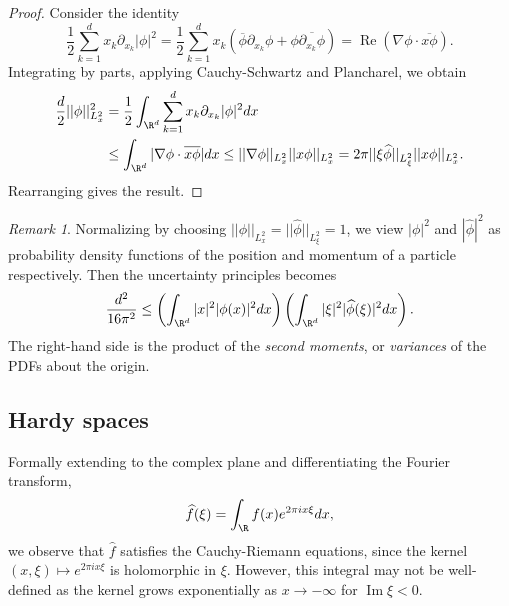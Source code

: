 \documentclass[reqno]{amsart}
\theoremstyle{definition}
\theoremstyle{remark}
\newtheorem*{remark}{Remark}
\renewcommand{\Re}{\operatorname{Re}}
\renewcommand{\Im}{\operatorname{Im}}
\begin{document}
\begin{proof}
	Consider the identity
		\[ \frac12\sum_{k = 1}^d  x_k \partial_{x_k} |\phi|^2 = \frac12 \sum_{k = 1}^d x_k (\overline \phi \partial_{x_k} \phi + \phi \overline{\partial_{x_k} \phi})= \Re (\nabla \phi \cdot \overline{x \phi}). \]
	Integrating by parts, applying Cauchy-Schwartz and Plancharel, we obtain
		\begin{align*}
			\frac{d}{2}
			||\phi||_{L^2_x}^2
				&= 
			\frac12\int_{\R^d} \sum_{k = 1}^d  x_k \partial_{x_k} |\phi|^2 dx
			\\
			&\leq \int_{\R^d} |\nabla \phi \cdot \overline{x \phi}| dx \leq ||\nabla \phi||_{L^2_x} ||x \phi||_{L^2_x} = 2\pi ||\xi \widehat \phi||_{L^2_\xi} ||x \phi||_{L^2_x}.
		\end{align*}	
	Rearranging gives the result. 	
\end{proof}

\begin{remark}
	Normalizing by choosing $||\phi||_{L^2_x} = ||\widehat \phi||_{L^2_\xi} = 1$, we view $|\phi|^2$ and $|\widehat \phi|^2$ as probability density functions of the position and momentum of a particle respectively. Then the uncertainty principles becomes
		\[ \frac{d^2}{16\pi^2} \leq \left( \int_{\R^d} |x|^2 |\phi(x)|^2 dx \right) \left( \int_{\R^d} |\xi|^2 |\widehat\phi(\xi)|^2 dx \right) .\]
	The right-hand side is the product of the \textit{second moments}, or \textit{variances} of the PDFs about the origin. 
\end{remark}


\subsection{Hardy spaces}

Formally extending to the complex plane and differentiating the Fourier transform, 
	\[ \widehat f(\xi) =\int_\R f(x) e^{2\pi i x \xi} dx, \]
we observe that $\widehat f$ satisfies the Cauchy-Riemann equations, since the kernel $(x, \xi) \mapsto e^{2\pi i x \xi}$ is holomorphic in $\xi$. However, this integral may not be well-defined as the kernel grows exponentially as $x \to -\infty$ for $\Im \xi < 0$. 
\end{document}
